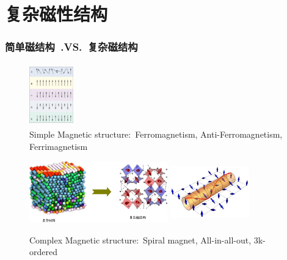 \documentclass[cjk,slidestop,compress,mathserif,blue]{beamer}
\begin{document}
\section{复杂磁性结构}
\frame
{
	\frametitle{简单磁结构~\textrm{.VS.}~复杂磁结构}
\begin{figure}[h!]
\vspace*{-0.08in}
\centering
\includegraphics[height=1.05in,width=0.75in]{Figures/Magnet-simple.png}
\caption{\tiny \textrm{Simple Magnetic structure:~Ferromagnetism, Anti-Ferromagnetism, Ferrimagnetism}}%
\label{Fig:Simple-Magnet}
\end{figure}
\begin{figure}[h!]
\vspace*{-0.08in}
\centering
\includegraphics[height=1.05in,width=2.35in]{Figures/Magnet-complex-compound.png}
\hskip 0.5pt
\includegraphics[height=1.05in,width=1.35in]{Figures/Magnet-complex.png}
\caption{\tiny \textrm{Complex Magnetic structure:~Spiral magnet, All-in-all-out, 3k-ordered}}%
\label{Fig:Simple-Magnet}
\end{figure}
}
\end{document}
